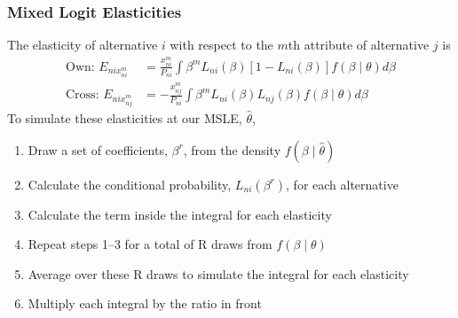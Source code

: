 \documentclass{beamer}\usepackage[]{graphicx}\usepackage[]{color}
\makeatletter
\newcommand{\hlcom}[1]{\textcolor[rgb]{0.678,0.584,0.686}{\textit{#1}}}%
\newcommand{\hlopt}[1]{\textcolor[rgb]{0,0,0}{#1}}%
\newcommand{\hlstd}[1]{\textcolor[rgb]{0.345,0.345,0.345}{#1}}%
\newcommand{\hlkwd}[1]{\textcolor[rgb]{0.737,0.353,0.396}{\textbf{#1}}}%
\newenvironment{kframe}{%
 \def\at@end@of@kframe{}%
 \ifinner\ifhmode%
  \def\at@end@of@kframe{\end{minipage}}%
  \begin{minipage}{\columnwidth}%
 \fi\fi%
 \def\FrameCommand##1{\hskip\@totalleftmargin \hskip-\fboxsep
 \colorbox{shadecolor}{##1}\hskip-\fboxsep
     \hskip-\linewidth \hskip-\@totalleftmargin \hskip\columnwidth}%
 \MakeFramed {\advance\hsize-\width
   \@totalleftmargin\z@ \linewidth\hsize
   \@setminipage}}%
 {\par\unskip\endMakeFramed%
 \at@end@of@kframe}
\newenvironment{knitrout}{}{} %
\makeatother
\begin{document}

\begin{frame}\frametitle{Mixed Logit Elasticities}
    The elasticity of alternative $i$ with respect to the $m$th attribute of alternative $j$ is
    \begin{align*}
    	\text{Own: } E_{nix_{ni}^m} &= \frac{x_{ni}^m}{P_{ni}} \int \beta^m L_{ni}(\beta) [1 - L_{ni}(\beta)] f(\beta \mid \theta) d \beta \\
    	\text{Cross: } E_{nix_{nj}^m} &= - \frac{x_{nj}^m}{P_{ni}} \int \beta^m L_{ni}(\beta) L_{nj}(\beta) f(\beta \mid \theta) d \beta
    \end{align*}
    To simulate these elasticities at our MSLE, $\hat{\theta}$,
    \begin{enumerate}
        \item Draw a set of coefficients, $\beta^r$, from the density $f(\beta \mid \hat{\theta})$
        \item Calculate the conditional probability, $L_{ni}(\beta^r)$, for each alternative
        \item Calculate the term inside the integral for each elasticity
        \item Repeat steps 1--3 for a total of R draws from $f(\beta \mid \theta)$
        \item Average over these R draws to simulate the integral for each elasticity
        \item Multiply each integral by the ratio in front
    \end{enumerate}
\end{frame}
\end{document}
